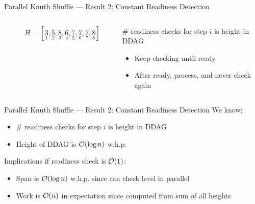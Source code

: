 \begin{frame}{Parallel Knuth Shuffle --- Result 2: Constant Readiness Detection}
  \begin{columns}
    \begin{column}{0.4\textwidth}
      \begin{figure}[ht]
        \centering
        \caption{\(H = [
          \underset{1}{3}, 
          \underset{2}{5}, 
          \underset{3}{8}, 
          \underset{4}{6}, 
          \underset{5}{7}, 
          \underset{6}{7}, 
          \underset{7}{7}, 
          \underset{8}{8} 
        ]\)}
      \end{figure}
    \end{column}
    \hfill
    \begin{column}{0.6\textwidth}
      \# readiness checks for step \(i\) is height in DDAG
      \begin{itemize}
        \item Keep checking until ready
        \item After ready, process, and never check again
      \end{itemize}
    \end{column}
  \end{columns}
\end{frame}

\begin{frame}{Parallel Knuth Shuffle --- Result 2: Constant Readiness Detection}
  We know:
  \begin{itemize}
    \item \# readiness checks for step \(i\) is height in DDAG
    \item Height of DDAG is \(\mathcal{O}(\log n)\) w.h.p. \cite{julian-parperm}
  \end{itemize}

  Implications if readiness check is \(\mathcal{O}(1)\):
  \begin{itemize}
    \item Span is \(\mathcal{O}(\log n)\) w.h.p. since can check level in parallel
    \item Work is \(\mathcal{O}(n)\) in expectation since computed from sum of all heights
  \end{itemize}
\end{frame}

